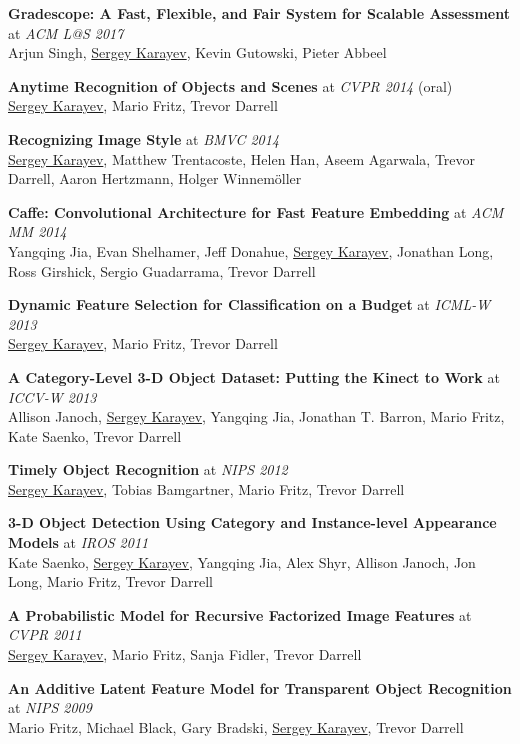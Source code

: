 \documentclass[line, margin]{res}
\begin{document}
\begin{resume}
\textbf{Gradescope: A Fast, Flexible, and Fair System for Scalable Assessment} at \emph{ACM L@S 2017}\\
Arjun Singh, \underline{Sergey Karayev}, Kevin Gutowski, Pieter Abbeel

\textbf{Anytime Recognition of Objects and Scenes} at \emph{CVPR 2014} (oral)\\
\underline{Sergey Karayev}, Mario Fritz, Trevor Darrell

\textbf{Recognizing Image Style} at \emph{BMVC 2014}\\
\underline{Sergey Karayev}, Matthew Trentacoste, Helen Han, Aseem Agarwala, Trevor Darrell, Aaron Hertzmann, Holger Winnem\"{o}ller

\textbf{Caffe: Convolutional Architecture for Fast Feature Embedding} at \emph{ACM MM 2014}\\
Yangqing Jia, Evan Shelhamer, Jeff Donahue, \underline{Sergey Karayev},
Jonathan Long, Ross Girshick, Sergio Guadarrama, Trevor Darrell

\textbf{Dynamic Feature Selection for Classification on a Budget} at \emph{ICML-W 2013}\\
\underline{Sergey Karayev}, Mario Fritz, Trevor Darrell

\textbf{A Category-Level 3-D Object Dataset: Putting the Kinect to Work} at \emph{ICCV-W 2013}\\
Allison Janoch, \underline{Sergey Karayev}, Yangqing Jia, Jonathan T. Barron, Mario Fritz, Kate Saenko, Trevor Darrell

\textbf{Timely Object Recognition} at \emph{NIPS 2012}\\
\underline{Sergey Karayev}, Tobias Bamgartner, Mario Fritz, Trevor Darrell

\textbf{3-D Object Detection Using Category and Instance-level Appearance Models} at \emph{IROS 2011}\\
Kate Saenko, \underline{Sergey Karayev}, Yangqing Jia, Alex Shyr, Allison Janoch, Jon Long, Mario Fritz, Trevor Darrell

\textbf{A Probabilistic Model for Recursive Factorized Image Features} at \emph{CVPR 2011}\\
\underline{Sergey Karayev}, Mario Fritz, Sanja Fidler, Trevor Darrell

\textbf{An Additive Latent Feature Model for Transparent Object Recognition} at \emph{NIPS 2009}\\
Mario Fritz, Michael Black, Gary Bradski, \underline{Sergey Karayev}, Trevor Darrell


\end{resume}
\end{document}

